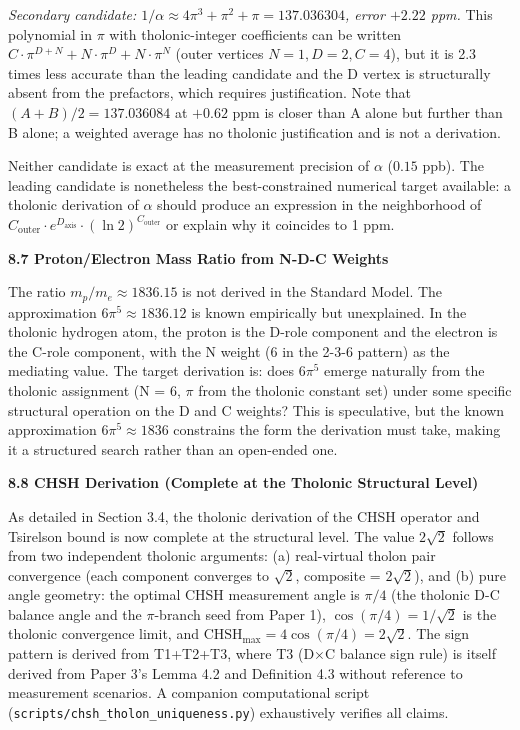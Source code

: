 \documentclass[
  11pt,
  letterpaper,
]{article}
\begin{document}
\emph{Secondary candidate:
\(1/\alpha \approx 4\pi^3 + \pi^2 + \pi = 137.036304\), error \(+2.22\)
ppm.} This polynomial in \(\pi\) with tholonic-integer coefficients can
be written \(C \cdot \pi^{D+N} + N \cdot \pi^D + N \cdot \pi^N\) (outer
vertices \(N=1, D=2, C=4\)), but it is 2.3 times less accurate than the
leading candidate and the D vertex is structurally absent from the
prefactors, which requires justification. Note that
\((A + B)/2 = 137.036084\) at \(+0.62\) ppm is closer than A alone but
further than B alone; a weighted average has no tholonic justification
and is not a derivation.

Neither candidate is exact at the measurement precision of \(\alpha\)
(\(0.15\) ppb). The leading candidate is nonetheless the
best-constrained numerical target available: a tholonic derivation of
\(\alpha\) should produce an expression in the neighborhood of
\(C_\text{outer} \cdot e^{D_\text{axis}} \cdot (\ln 2)^{C_\text{outer}}\)
or explain why it coincides to 1 ppm.

\textbf{8.7 Proton/Electron Mass Ratio from N-D-C Weights}

The ratio \(m_p/m_e \approx 1836.15\) is not derived in the Standard
Model. The approximation \(6\pi^5 \approx 1836.12\) is known empirically
but unexplained. In the tholonic hydrogen atom, the proton is the D-role
component and the electron is the C-role component, with the N weight (6
in the 2-3-6 pattern) as the mediating value. The target derivation is:
does \(6\pi^5\) emerge naturally from the tholonic assignment (N = 6,
\(\pi\) from the tholonic constant set) under some specific structural
operation on the D and C weights? This is speculative, but the known
approximation \(6\pi^5 \approx 1836\) constrains the form the derivation
must take, making it a structured search rather than an open-ended one.

\textbf{8.8 CHSH Derivation (Complete at the Tholonic Structural Level)}

As detailed in Section 3.4, the tholonic derivation of the CHSH operator
and Tsirelson bound is now complete at the structural level. The value
\(2\sqrt{2}\) follows from two independent tholonic arguments: (a)
real-virtual tholon pair convergence (each component converges to
\(\sqrt{2}\), composite = \(2\sqrt{2}\)), and (b) pure angle geometry:
the optimal CHSH measurement angle is \(\pi/4\) (the tholonic D-C
balance angle and the \(\pi\)-branch seed from Paper 1),
\(\cos(\pi/4) = 1/\sqrt{2}\) is the tholonic convergence limit, and
\(\mathrm{CHSH}_{\max} = 4\cos(\pi/4) = 2\sqrt{2}\). The sign pattern is
derived from T1+T2+T3, where T3 (D\(\times\)C balance sign rule) is
itself derived from Paper 3's Lemma 4.2 and Definition 4.3 without
reference to measurement scenarios. A companion computational script
(\texttt{scripts/chsh\_tholon\_uniqueness.py}) exhaustively verifies all
claims.
\end{document}

